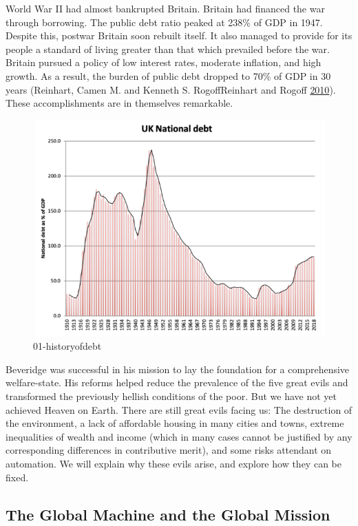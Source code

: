 \documentclass[]{tufte-handout}
\begin{document}
World War II had almost bankrupted Britain. Britain had financed the war
through borrowing. The public debt ratio peaked at 238\% of GDP in 1947.
Despite this, postwar Britain soon rebuilt itself. It also managed to
provide for its people a standard of living greater than that which
prevailed before the war. Britain pursued a policy of low interest
rates, moderate inflation, and high growth. As a result, the burden of
public debt dropped to 70\% of GDP in 30 years (Reinhart, Camen M. and
Kenneth S. RogoffReinhart and Rogoff
\protect\hyperlink{ref-ReinhartCamenM.andKennethS.RogoffReinhart2010}{2010}).
These accomplishments are in themselves remarkable.

\begin{figure}
\centering
\includegraphics{ChapterPictures/HistoryOfDebt.png}
\caption{01-historyofdebt}
\end{figure}

Beveridge was successful in his mission to lay the foundation for a
comprehensive welfare-state. His reforms helped reduce the prevalence of
the five great evils and transformed the previously hellish conditions
of the poor. But we have not yet achieved Heaven on Earth. There are
still great evils facing us: The destruction of the environment, a lack
of affordable housing in many cities and towns, extreme inequalities of
wealth and income (which in many cases cannot be justified by any
corresponding differences in contributive merit), and some risks
attendant on automation. We will explain why these evils arise, and
explore how they can be fixed.

\hypertarget{the-global-machine-and-the-global-mission}{%
\subsection{The Global Machine and the Global
Mission}\label{the-global-machine-and-the-global-mission}}
\end{document}
